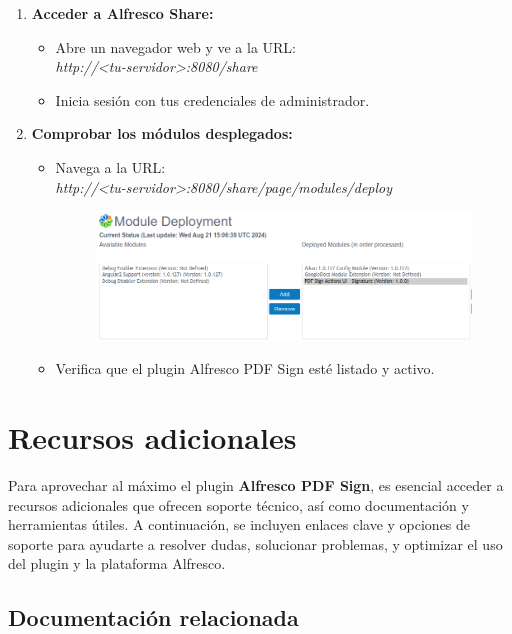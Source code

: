 \documentclass{template/ol-softwaremanual}
\begin{document}
\begin{enumerate}
	\item \textbf{Acceder a Alfresco Share:}
	\begin{itemize}
	 	\item Abre un navegador web y ve a la URL: \\ \textit{http://<tu-servidor>:8080/share}
	 	\item Inicia sesión con tus credenciales de administrador.
	\end{itemize}
	\item \textbf{Comprobar los módulos desplegados:}
	\begin{itemize}
		\item Navega a la URL: \\ \textit{http://<tu-servidor>:8080/share/page/modules/deploy}
		\begin{figure}[h]
			\centering
			\includegraphics[width=\textwidth]{images/module}
			\label{fig:etiqueta_imagen}
		\end{figure}
		\item Verifica que el plugin Alfresco PDF Sign esté listado y activo.
	\end{itemize}
\end{enumerate}

\section{Recursos adicionales}

Para aprovechar al máximo el plugin \textbf{Alfresco PDF Sign}, es esencial acceder a recursos adicionales que ofrecen soporte técnico, así como documentación y herramientas útiles. A continuación, se incluyen enlaces clave y opciones de soporte para ayudarte a resolver dudas, solucionar problemas, y optimizar el uso del plugin y la plataforma Alfresco.

\subsection{Documentación relacionada}
\end{document}

